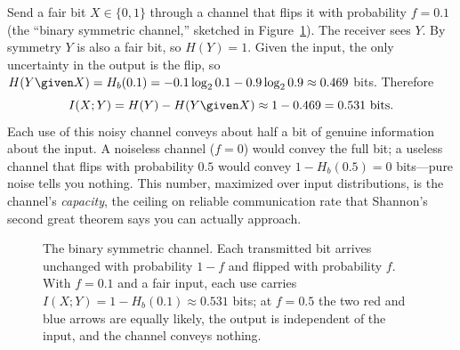 \begin{example}
\label{ch33:noisy-channel}
Send a fair bit $X \in \{0,1\}$ through a channel that flips it with probability $f = 0.1$ (the ``binary
symmetric channel,'' sketched in Figure~\ref{ch33:fig-bsc}). The receiver sees $Y$. By symmetry $Y$ is
also a fair bit, so $H(Y) = 1$. Given the
input, the only uncertainty in the output is the flip, so $H(Y\given X) = H_b(0.1) = -0.1\log_2 0.1 -
0.9\log_2 0.9 \approx 0.469$ bits. Therefore
\[
  I(X;Y) = H(Y) - H(Y\given X) \approx 1 - 0.469 = 0.531 \text{ bits.}
\]
Each use of this noisy channel conveys about half a bit of genuine information about the input. A noiseless
channel ($f=0$) would convey the full bit; a useless channel that flips with probability $0.5$ would
convey $1 - H_b(0.5) = 0$ bits---pure noise tells you nothing. This number, maximized over input
distributions, is the channel's \emph{capacity}, the ceiling on reliable communication rate that Shannon's
second great theorem says you can actually approach.
\end{example}

\begin{figure}[H]
\centering
{}
\caption{The binary symmetric channel. Each transmitted bit arrives unchanged with probability $1-f$ and
flipped with probability $f$. With $f=0.1$ and a fair input, each use carries
$I(X;Y)=1-H_b(0.1)\approx 0.531$ bits; at $f=0.5$ the two red and blue arrows are equally likely, the
output is independent of the input, and the channel conveys nothing.}
\label{ch33:fig-bsc}
\end{figure}

